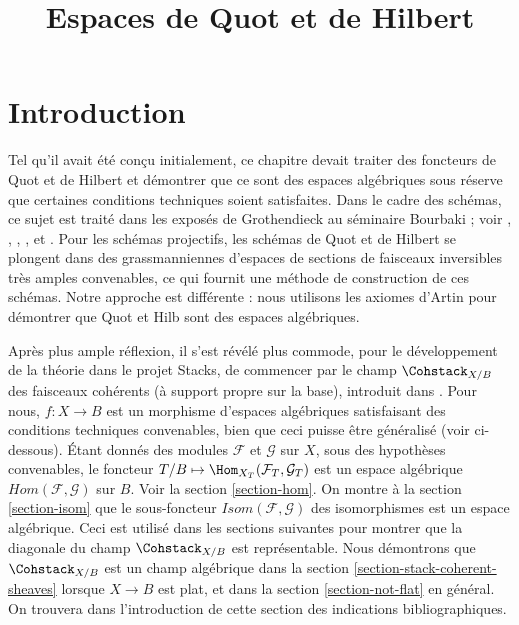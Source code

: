 

%


\title{Espaces de Quot et de Hilbert}

\maketitle

\label{section-phantom}

\tableofcontents




\section{Introduction}
\label{section-introduction}

\noindent
Tel qu'il avait été conçu initialement, ce chapitre devait traiter des
foncteurs de Quot et de Hilbert et démontrer que ce sont des espaces
algébriques sous réserve que certaines conditions techniques soient
satisfaites. Dans le cadre des schémas, ce sujet est traité dans les exposés
de Grothendieck au séminaire Bourbaki ; voir
\cite{Gr-I},
\cite{Gr-II},
\cite{Gr-III},
\cite{Gr-IV},
\cite{Gr-V} et
\cite{Gr-VI}. Pour les schémas projectifs, les schémas de Quot et de Hilbert
se plongent dans des grassmanniennes d'espaces de sections de faisceaux
inversibles très amples convenables, ce qui fournit une méthode de
construction de ces schémas. Notre approche est différente : nous utilisons
les axiomes d'Artin pour démontrer que Quot et Hilb sont des espaces
algébriques.

\medskip\noindent
Après plus ample réflexion, il s'est révélé plus commode, pour le
développement de la théorie dans le projet Stacks, de commencer par le champ
$\Cohstack_{X/B}$ des faisceaux cohérents (à support propre sur la base),
introduit dans \cite{lieblich_remarks}. Pour nous, $f : X \to B$ est un
morphisme d'espaces algébriques satisfaisant des conditions techniques
convenables, bien que ceci puisse être généralisé (voir ci-dessous). Étant
donnés des modules $\mathcal{F}$ et $\mathcal{G}$ sur $X$, sous des
hypothèses convenables, le foncteur
$T/B \mapsto \Hom_{X_T}(\mathcal{F}_T, \mathcal{G}_T)$ est un espace
algébrique $\mathit{Hom}(\mathcal{F}, \mathcal{G})$ sur $B$. Voir la
section \ref{section-hom}. On montre à la section \ref{section-isom} que le
sous-foncteur $\mathit{Isom}(\mathcal{F}, \mathcal{G})$ des isomorphismes est
un espace algébrique. Ceci est utilisé dans les sections suivantes pour
montrer que la diagonale du champ $\Cohstack_{X/B}$ est représentable. Nous
démontrons que $\Cohstack_{X/B}$ est un champ algébrique dans la section
\ref{section-stack-coherent-sheaves} lorsque $X \to B$ est plat, et dans la
section \ref{section-not-flat} en général. On trouvera dans l'introduction de
cette section des indications bibliographiques.

